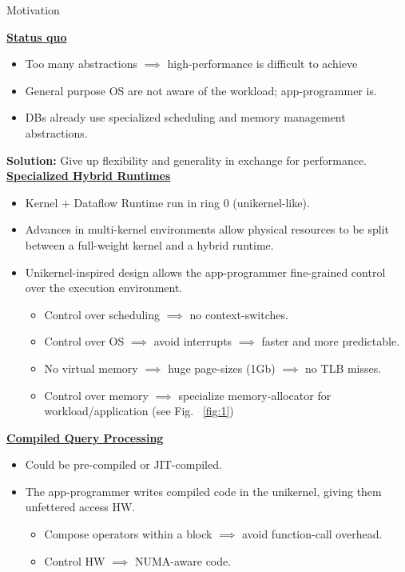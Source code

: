 \begin{block}{Motivation}




\underline{\textbf{Status quo}}
  \begin{itemize}
    \item Too many abstractions $\implies$ high-performance is difficult to achieve
    \item General purpose OS are not aware of the workload; app-programmer is.
    \item DBs already use specialized scheduling and memory management abstractions.
    \end{itemize}
 \alert{\textbf{Solution:} Give up flexibility and generality in exchange for performance.}\\[7mm]
    
\underline{\textbf{Specialized Hybrid Runtimes}}
    \begin{itemize}
    \item Kernel + Dataflow Runtime run in ring 0 (unikernel-like).
    \item Advances in multi-kernel environments allow physical  resources to be split between a full-weight kernel and a hybrid runtime.
    \item {Unikernel-inspired design allows the app-programmer fine-grained control over the execution environment.}
      \begin{itemize}
      \item Control over scheduling $\implies$ no context-switches.
      \item Control over OS $\implies$ avoid interrupts $\implies$ faster and more predictable.
      \item No virtual memory $\implies$ huge page-sizes (1Gb) $\implies$ no TLB misses.
      \item Control over memory $\implies$ specialize memory-allocator for workload/application (see Fig.~ \ref{fig:1})
      \end{itemize}
    \end{itemize}

    \underline{\textbf{Compiled Query Processing}}
    \begin{itemize}
    \item Could be pre-compiled or JIT-compiled.
    \item {The app-programmer writes compiled code in the unikernel, giving them unfettered access HW.}
      \begin{itemize}
      \item Compose operators within a block $\implies$ avoid function-call overhead.
      \item Control HW $\implies$ NUMA-aware code.
      \end{itemize}
    \end{itemize}
\end{block}


